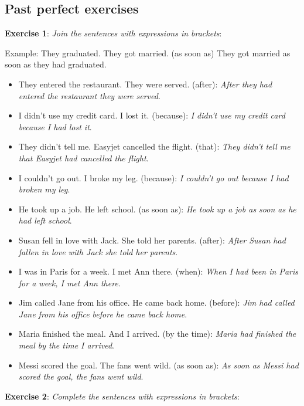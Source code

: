 \subsection{Past perfect exercises}

\textbf{Exercise 1}: \textit{Join the sentences with expressions in brackets}:

Example:
They graduated. They got married. (as soon as) 
They got married as soon as they had graduated.

\begin{itemize}

\item They entered the restaurant. They were served. (after): \textit{After they had entered the restaurant they were served}.
\item I didn't use my credit card. I lost it. (because): \textit{I didn't use my credit card because I had lost it}.
\item They didn't tell me. Easyjet cancelled the flight. (that): \textit{They didn't tell me that Easyjet had cancelled the flight}.
\item I couldn't go out. I broke my leg. (because): \textit{I couldn't go out because I had broken my leg}.
\item He took up a job. He left school. (as soon as): \textit{He took up a job as soon as he had left school}.
\item Susan fell in love with Jack. She told her parents. (after): \textit{After Susan had fallen in love with Jack she told her parents}.
\item I was in Paris for a week. I met Ann there. (when): \textit{When I had been in Paris for a week, I met Ann there}.
\item Jim called Jane from his office. He came back home. (before): \textit{Jim had called Jane from his office before he came back home}.
\item Maria finished the meal. And I arrived. (by the time): \textit{Maria had finished the meal by the time I arrived}.
\item Messi scored the goal. The fans went wild. (as soon as): \textit{As soon as Messi had scored the goal, the fans went wild}.

\end{itemize}

\textbf{Exercise 2}: \textit{Complete the sentences with expressions in brackets}:


